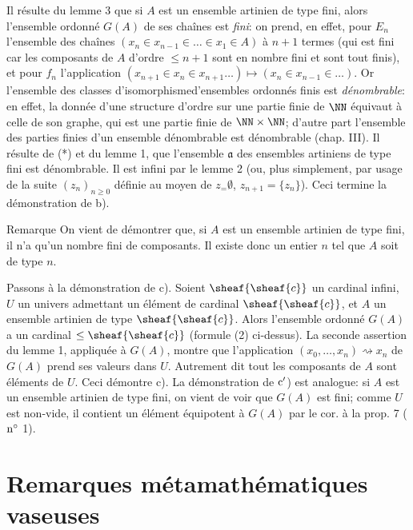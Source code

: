 Il résulte du lemme 3 que si $A$ est un ensemble artinien de type
fini, alors l'ensemble ordonné $G(A)$ de ses chaînes est
\emph{fini}: on prend, en effet, pour $E_n$ l'ensemble des chaînes
$(x_n\in x_{n-1}\in\ldots \in x_1\in A)$ à $n+1$ termes (qui est
fini car les composants de $A$ d'ordre $\leq n+1$ sont en nombre
fini et sont tout finis), et pour $f_n$ l'application $(x_{n+1}\in
x_n\in x_{n+1}\ldots)\mapsto (x_n\in x_{n-1}\in\ldots)$. Or
l'ensemble des classes d'isomorphisme\pageoriginale d'ensembles
ordonnés finis est \emph{dénombrable}: en effet, la donnée d'une
structure d'ordre sur une partie finie de $\NN$ équivaut à celle de
son graphe, qui est une partie finie de $\NN\times\NN$; d'autre part
l'ensemble des parties finies d'un ensemble dénombrable est
dénombrable (chap. III). Il résulte de (*) et du lemme 1, que
l'ensemble $\mathfrak{a}$ des ensembles artiniens de type fini est
dénombrable. Il est infini par le lemme 2 (ou, plus simplement, par
usage de la suite $(z_n)_{n\geq 0} $ définie au moyen de
$z_=∅$, $z_{n+1}=\{z_n\}$). Ceci termine la démonstration
de b).

\begin{enonce*}[remark]{Remarque}
On vient de démontrer que, si $A$ est un ensemble artinien de type
fini, il n'a qu'un nombre fini de composants. Il existe donc un
entier $n$ tel que $A$ soit de type $n$.
\end{enonce*}
Passons à la démonstration de c). Soient $\sheaf{\sheaf{c}}$ un
cardinal infini, $U$ un univers admettant un élément de cardinal
$\sheaf{\sheaf{c}}$, et $A$ un ensemble artinien de type
$\sheaf{\sheaf{c}}$. Alors l'ensemble ordonné $G(A)$ a un cardinal
$\leq \sheaf{\sheaf{c}}$ (formule (2) ci-dessus). La seconde
assertion du lemme 1, appliquée à $G(A)$, montre que l'application
$(x_0,\ldots, x_n)\rightsquigarrow x_n$ de $G(A)$ prend ses valeurs
dans $U$. Autrement dit tout les composants de $A$ sont éléments de
$U$. Ceci démontre c). La démonstration de ${\rm c'}$) est analogue:
si $A$ est un ensemble artinien de type fini, on vient de voir que
$G(A)$ est fini; comme $U$ est non-vide, il contient un élément
équipotent à $G(A)$ par le cor. à la prop. 7 (${\rm n^{\circ}}$ 1).
\cqfd

\section{Remarques métamathématiques vaseuses}\pageoriginale

